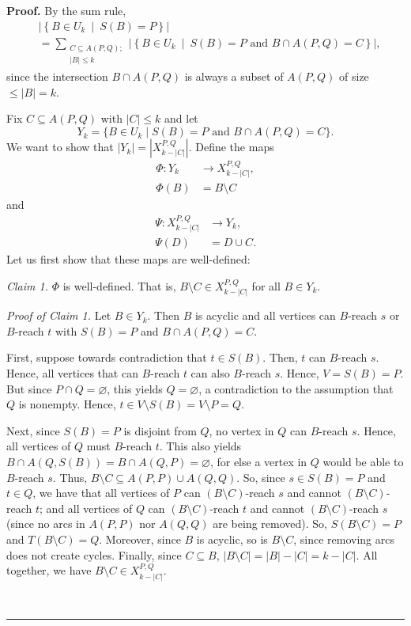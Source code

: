 \documentclass[numbers=enddot,12pt,final,onecolumn,notitlepage]{scrartcl}%
\theoremstyle{definition}
\newenvironment{proof}[1][Proof]{\noindent\textbf{#1.} }{\ \rule{0.5em}{0.5em}}
\let\sumnonlimits\sum
\renewcommand{\sum}{\sumnonlimits\limits}
\theoremstyle{plainsl}
\begin{document}
\begin{proof}
    By the sum rule,
	\begin{align*}
&  \left\vert \left\{  B\in U_{k}\ \mid\ S\left(  B\right)  =P\right\}
\right\vert \\
&  =\sum_{\substack{C\subseteq A\left(  P,Q\right); \\ \left|B\right| \leq k}  }\left\vert \left\{  B\in
U_{k}\ \mid\ S\left(  B\right)  =P\text{ and }B\cap A\left(  P,Q\right)
=C\right\}  \right\vert ,
\end{align*}
since the intersection $B\cap A\left(  P,Q\right)  $ is always a subset of
$A\left(  P,Q\right)  $ of size $\leq \left|B\right| = k$.

Fix $C \subseteq A(P,Q)$ with $|C| \leq k$ and let \begin{equation*}
    Y_k = \{B \in U_{k} \mid  S(B) = P \text{ and } B \cap A(P,Q) = C\}.
\end{equation*}
We want to show that $|Y_k| = |X_{k-|C|}^{P,Q}|$. Define the maps
 \begin{align*}
    \Phi : Y_k &\to X_{k-|C|}^{P,Q}, \\
	\Phi(B) &= B \setminus C
 \end{align*}
 and
 \begin{align*}
    \Psi : X_{k-|C|}^{P,Q} &\to Y_{k}, \\
	\Psi(D) &= D \cup C.
 \end{align*}
Let us first show that these maps are well-defined:

\textit{Claim 1.} $\Phi$ is well-defined. That is, $B \setminus C \in X_{k-|C|}^{P,Q}$ for all $B \in Y_{k}$.

\smallskip
\textit{Proof of Claim 1.} Let $B \in Y_{k}$. Then $B$ is acyclic and all vertices can $B$-reach $s$ or $B$-reach $t$ with $S(B) = P$ and $B \cap A(P,Q) = C$.

First, suppose towards contradiction that $t \in S(B)$. Then, $t$ can $B$-reach $s$. Hence, all vertices that can $B$-reach $t$ can also $B$-reach $s$. Hence, $V = S(B) = P$. But since $P \cap Q = \varnothing$, this yields $Q = \varnothing$, a contradiction to the assumption that $Q$ is nonempty. Hence, $t \in V \setminus S(B) = V \setminus P = Q$. 

Next, since $S(B) = P$ is disjoint from $Q$, no vertex in $Q$ can $B$-reach $s$. Hence, all vertices of $Q$ must $B$-reach $t$. This also yields $B \cap A(Q,S(B)) = B \cap A(Q,P) = \varnothing$, for else a vertex in $Q$ would be able to $B$-reach $s$. Thus, $B \setminus C \subseteq A(P,P) \cup A(Q,Q)$. So, since $s \in S(B) = P$ and $t \in Q$, we have that all vertices of $P$ can $(B \setminus C)$-reach $s$ and cannot $(B \setminus C)$-reach $t$; and all vertices of $Q$ can $(B \setminus C)$-reach $t$ and cannot $(B \setminus C)$-reach $s$ (since no arcs in $A(P,P)$ nor $A(Q,Q)$ are being removed). So, $S(B \setminus C) = P$ and $T(B \setminus C) = Q$. Moreover, since $B$ is acyclic, so is $B \setminus C$, since removing arcs does not create cycles. Finally, since $C \subseteq B$, $|B \setminus C| = |B|-|C| = k-|C|$. All together, we have $B \setminus C \in X_{k-|C|}^{P,Q}$.


\end{proof}
\end{document}
